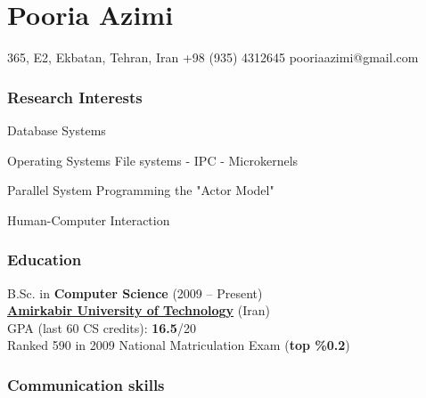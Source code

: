 \documentclass{tccv}
\begin{document}
\part{Pooria Azimi}

\personal
    {365, E2, Ekbatan, Tehran, Iran}
    {+98 (935) 4312645}
    {pooriaazimi@gmail.com}







\section{Research Interests}


\begin{research_interest}

\item{Database Systems}
     {}

\item{Operating Systems}
     {File systems - IPC - Microkernels}

\item{Parallel System Programming}
     {the "Actor Model"}

\item{Human-Computer Interaction}
     {}

\end{research_interest}








\section{Education}

B.Sc. in {\bf\large Computer Science} (2009 -- Present)
\\[1.5pt]
{\bf \href{https://en.wikipedia.org/wiki/Amirkabir_University_of_Technology}{Amirkabir University of Technology}} (Iran)
\\[1.7pt]
GPA (last 60 CS credits): {\bf 16.5}/20
\bigskip\\
Ranked 590 in 2009 National Matriculation Exam ({\bf top \%0.2})








\section{Communication skills}
\end{document}
